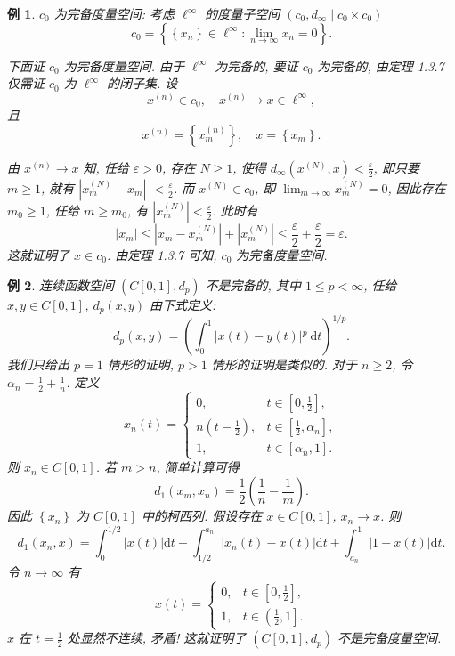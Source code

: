 \documentclass[openany]{ctexbook}
\theoremstyle{kaiti}
\theoremstyle{normal}
\newtheorem{example}{例}[section]
\begin{document}
\begin{example}
$c_0$ 为完备度量空间: 考虑 $\ell^{\infty}$ 的度量子空间 $\left(c_0, d_{\infty} \mid c_0 \times c_0\right)$
$$
c_0=\left\{\left\{x_n\right\} \in \ell^{\infty}: \lim_{n \rightarrow \infty} x_n=0\right\}.
$$

下面证 $c_0$ 为完备度量空间. 由于 $\ell^{\infty}$ 为完备的, 要证 $c_0$ 为完备的, 由定理 1.3.7 仅需证 $c_0$ 为 $\ell^{\infty}$ 的闭子集. 设
$$
x^{(n)} \in c_0, \quad x^{(n)} \rightarrow x \in \ell^{\infty},
$$
且
$$
x^{(n)}=\left\{x_m^{(n)}\right\}, \quad x=\left\{x_m\right\}.
$$

由 $x^{(n)} \rightarrow x$ 知, 任给 $\varepsilon>0$, 存在 $N \geqslant 1$, 使得 $d_{\infty}\left(x^{(N)}, x\right)<\frac{\varepsilon}{2}$, 即只要 $m \geqslant 1$, 就有 $\left|x_m^{(N)}-x_m\right|$ $<\frac{\varepsilon}{2}$. 而 $x^{(N)} \in c_0$, 即 $\lim_{m \rightarrow \infty} x_m^{(N)}=0$, 因此存在 $m_0 \geqslant 1$, 任给 $m \geqslant m_0$, 有 $\left|x_m^{(N)}\right|<\frac{\varepsilon}{2}$. 此时有
$$
\left|x_m\right| \leqslant\left|x_m-x_m^{(N)}\right|+\left|x_m^{(N)}\right| \leqslant \frac{\varepsilon}{2}+\frac{\varepsilon}{2}=\varepsilon.
$$
这就证明了 $x \in c_0$. 由定理 1.3.7 可知, $c_0$ 为完备度量空间.
\end{example}

\begin{example}
连续函数空间 $(C[0,1], d_{p})$ 不是完备的, 其中 $1 \leqslant p<\infty$, 任给 $x, y \in C[0,1]$, $d_{p}(x, y)$ 由下式定义:
$$
d_{p}(x, y)=\left(\int_0^1|x(t)-y(t)|{ }^{p} \mathrm{~d} t\right)^{1 / p}.
$$
我们只给出 $p=1$ 情形的证明, $p>1$ 情形的证明是类似的. 对于 $n \geqslant 2$, 令 $\alpha_n=\frac{1}{2}+\frac{1}{n}$. 定义
$$
x_n(t)= \begin{cases}0, & t \in\left[0, \frac{1}{2}\right], \\ n\left(t-\frac{1}{2}\right), & t \in\left[\frac{1}{2}, \alpha_n\right], \\ 1, & t \in\left[\alpha_n, 1\right].\end{cases}
$$
则 $x_n \in C[0,1]$. 若 $m>n$, 简单计算可得
$$
d_1\left(x_m, x_n\right)=\frac{1}{2}\left(\frac{1}{n}-\frac{1}{m}\right).
$$
因此 $\left\{x_n\right\}$ 为 $C[0,1]$ 中的柯西列. 假设存在 $x \in C[0,1]$, $x_n \rightarrow x$. 则
$$
d_1\left(x_n, x\right)=\int_0^{1 / 2}|x(t)| \mathrm{d} t+\int_{1 / 2}^{a_n}\left|x_n(t)-x(t)\right| \mathrm{d} t+\int_{a_n}^1|1-x(t)| \mathrm{d} t.
$$
令 $n\rightarrow\infty$ 有
$$
x(t)= 
\begin{cases}
  0, & t \in\left[0, \frac{1}{2}\right], \\
  1, & t \in\left(\frac{1}{2}, 1\right].
\end{cases}
$$
$x$ 在 $t=\frac{1}{2}$ 处显然不连续, 矛盾! 这就证明了 $\left(C[0,1], d_{p}\right)$ 不是完备度量空间.
\end{example}
\end{document}
